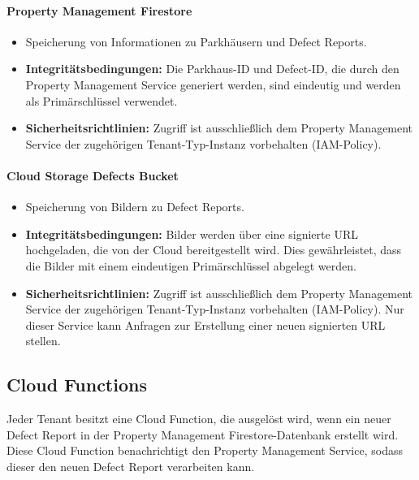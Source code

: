 \paragraph{Property Management Firestore}
\begin{itemize}
	\item Speicherung von Informationen zu Parkhäusern und Defect Reports.
	\item \textbf{Integritätsbedingungen:} Die Parkhaus-ID und Defect-ID, die durch den Property Management Service generiert werden, sind eindeutig und werden als Primärschlüssel verwendet.
	\item \textbf{Sicherheitsrichtlinien:} Zugriff ist ausschließlich dem Property Management Service der zugehörigen Tenant-Typ-Instanz vorbehalten (IAM-Policy).
\end{itemize}

\paragraph{Cloud Storage Defects Bucket}
\begin{itemize}
	\item Speicherung von Bildern zu Defect Reports.
	\item \textbf{Integritätsbedingungen:} Bilder werden über eine signierte URL hochgeladen, die von der Cloud bereitgestellt wird. Dies gewährleistet, dass die Bilder mit einem eindeutigen Primärschlüssel abgelegt werden.
	\item \textbf{Sicherheitsrichtlinien:} Zugriff ist ausschließlich dem Property Management Service der zugehörigen Tenant-Typ-Instanz vorbehalten (IAM-Policy). Nur dieser Service kann Anfragen zur Erstellung einer neuen signierten URL stellen.
\end{itemize}

\subsection{Cloud Functions}
Jeder Tenant besitzt eine Cloud Function, die ausgelöst wird, wenn ein neuer Defect Report in der Property Management Firestore-Datenbank erstellt wird. Diese Cloud Function benachrichtigt den Property Management Service, sodass dieser den neuen Defect Report verarbeiten kann.
